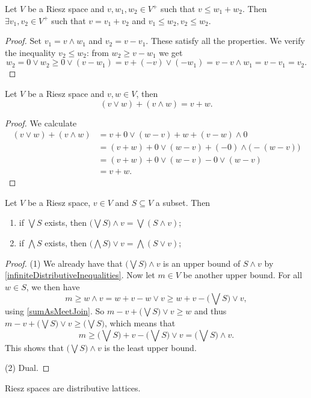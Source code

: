 \begin{theorem} \label{RieszDecomposition}
Let $V$ be a Riesz space and $v,w_1,w_2\in V^+$ such that $v \leq w_1 + w_2$. Then $\exists v_1, v_2\in V^+$ such that $v = v_1 + v_2$ and $v_1 \leq w_2, v_2 \leq w_2$.
\end{theorem}
\begin{proof}
Set $v_1 = v\wedge w_1$ and $v_2 = v - v_1$. These satisfy all the properties. We verify the inequality $v_2 \leq w_2$: from $w_2 \geq v - w_1$ we get
\[ w_2 = 0\vee w_2 \geq 0\vee (v - w_1) = v + (-v)\vee(-w_1) = v - v\wedge w_1 = v-v_1 = v_2. \]
\end{proof}

\begin{proposition} \label{sumAsMeetJoin}
Let $V$ be a Riesz space and $v,w\in V$, then
\[ (v \vee w) + (v \wedge w) = v+w. \]
\end{proposition}
\begin{proof}
We calculate
\begin{align*}
(v \vee w) + (v \wedge w) &= v + 0 \vee (w-v) + w + (v-w)\wedge 0 \\
&= (v + w) + 0 \vee (w-v) + (-0)\wedge \big(-(w-v)\big) \\
&= (v + w) + 0 \vee (w-v) - 0 \vee (w-v) \\
&= v + w.
\end{align*}
\end{proof}

\begin{proposition} \label{distributivityRieszSpaces}
Let $V$ be a Riesz space, $v\in V$ and $S\subseteq V$ a subset. Then
\begin{enumerate}
\item if $\bigvee S$ exists, then $\big(\bigvee S\big) \wedge v = \bigvee (S\wedge v)$;
\item if $\bigwedge S$ exists, then $\big(\bigwedge S\big) \vee v = \bigwedge (S\vee v)$;
\end{enumerate}
\end{proposition}
\begin{proof}
(1) We already have that $\big(\bigvee S\big) \wedge v$ is an upper bound of $S\wedge v$ by \ref{infiniteDistributiveInequalities}. Now let $m\in V$ be another upper bound. For all $w\in S$, we then have
\[ m \geq w\wedge v = w+v - w\vee v \geq w+v - \big(\bigvee S\big)\vee v, \]
using \ref{sumAsMeetJoin}. So $m - v + \big(\bigvee S\big)\vee v \geq w$ and thus $m - v + \big(\bigvee S\big)\vee v \geq \big(\bigvee S\big)$, which means that
\[ m \geq \big(\bigvee S\big) + v - \big(\bigvee S\big)\vee v = \big(\bigvee S\big)\wedge v. \]
This shows that $\big(\bigvee S\big)\wedge v$ is the least upper bound.

(2) Dual.
\end{proof}
\begin{corollary}
Riesz spaces are distributive lattices.
\end{corollary}


